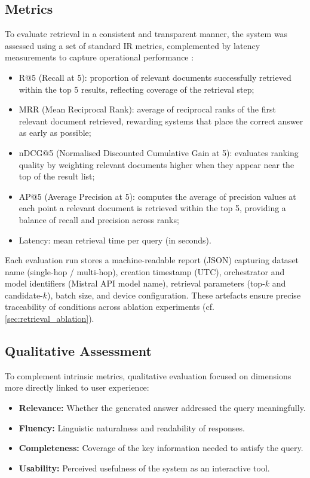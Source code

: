 \begin{spacing}{1.5}
\subsection{Metrics}\label{sec:metrics}
To evaluate retrieval in a consistent and transparent manner, the system was assessed using a set of standard IR metrics, complemented by latency measurements to capture operational performance \citep{wang_searching_2024}:

\begin{itemize}
    \item R@5 (Recall at 5): proportion of relevant documents successfully retrieved within the top 5 results, reflecting coverage of the retrieval step;
    \item MRR (Mean Reciprocal Rank): average of reciprocal ranks of the first relevant document retrieved, rewarding systems that place the correct answer as early as possible;
    \item nDCG@5 (Normalised Discounted Cumulative Gain at 5): evaluates ranking quality by weighting relevant documents higher when they appear near the top of the result list;
    \item AP@5 (Average Precision at 5): computes the average of precision values at each point a relevant document is retrieved within the top 5, providing a balance of recall and precision across ranks;
    \item Latency: mean retrieval time per query (in seconds).
\end{itemize}

Each evaluation run stores a machine-readable report (JSON) capturing dataset name (single-hop / multi-hop), creation timestamp (UTC), orchestrator and model identifiers (Mistral API model name), retrieval parameters (top-$k$ and candidate-$k$), batch size, and device configuration. These artefacts ensure precise traceability of conditions across ablation experiments (cf. \autoref{sec:retrieval_ablation}).

\subsection{Qualitative Assessment}
To complement intrinsic metrics, qualitative evaluation focused on dimensions more directly linked to user experience:
\begin{itemize}
      \item \textbf{Relevance:} Whether the generated answer addressed the query meaningfully.
      \item \textbf{Fluency:} Linguistic naturalness and readability of responses.
      \item \textbf{Completeness:} Coverage of the key information needed to satisfy the query.
      \item \textbf{Usability:} Perceived usefulness of the system as an interactive tool.
\end{itemize}


\end{spacing}
